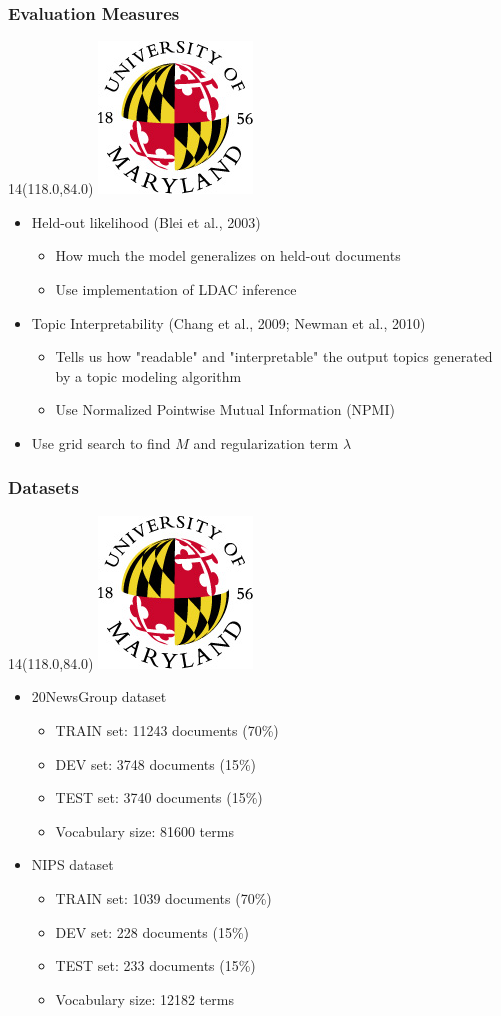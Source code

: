 \documentclass{beamer}
\let\oldframetitle\frametitle
\renewcommand{\frametitle}[1]{
\oldframetitle{#1}
\BottomLogo
}
\newcommand{\BottomLogo}{
\begin{textblock}{14}(118.0,84.0)
\includegraphics[height=.8cm]{figures/umd-logo1.jpg}
\end{textblock}
}
\begin{document}
\begin{frame}
\frametitle{Evaluation Measures}
\begin{itemize}
\item Held-out likelihood (Blei et al., 2003)
\begin{itemize}
\item How much the model generalizes on held-out documents
\item Use implementation of LDAC inference
\end{itemize}

\item Topic Interpretability (Chang et al., 2009; Newman et al., 2010)
\begin{itemize}
\item Tells us how "readable" and "interpretable" the output topics generated by a topic modeling algorithm
\item Use Normalized Pointwise Mutual Information (NPMI)
\end{itemize}

\item Use grid search to find $M$ and regularization term $\lambda$
\end{itemize}
\end{frame}

\begin{frame}
\frametitle{Datasets}

\begin{itemize}
\item 20NewsGroup dataset
\begin{itemize}
\item TRAIN set: 11243 documents (70\%)
\item DEV set: 3748 documents (15\%)
\item TEST set: 3740 documents (15\%)
\item Vocabulary size: 81600 terms
\end{itemize}

\item NIPS dataset
\begin{itemize}
\item TRAIN set: 1039 documents (70\%)
\item DEV set: 228 documents (15\%)
\item TEST set: 233 documents (15\%)
\item Vocabulary size: 12182 terms
\end{itemize}

\end{itemize}
\end{frame}
\end{document}
